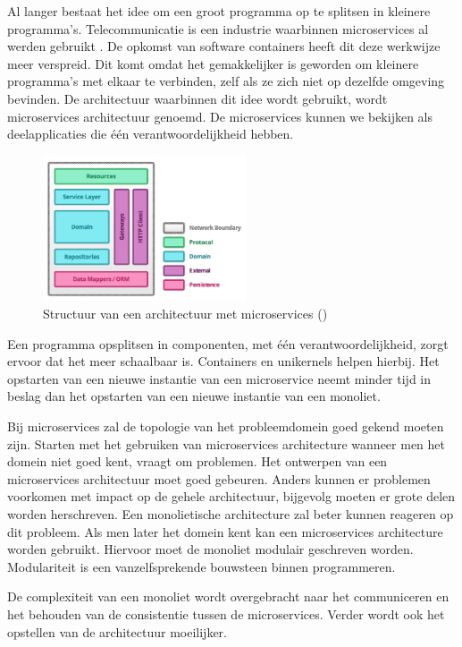 Al langer bestaat het idee om een groot programma op te splitsen in kleinere programma's. Telecommunicatie is een industrie waarbinnen microservices al werden gebruikt \cite{griffin_survey_2007}. De opkomst van software containers heeft dit deze werkwijze meer verspreid. Dit komt omdat het gemakkelijker is geworden om kleinere programma's met elkaar te verbinden, zelf als ze zich niet op dezelfde omgeving bevinden. De architectuur waarbinnen dit idee wordt gebruikt, wordt microservices architectuur genoemd. De microservices kunnen we bekijken als deelapplicaties die één verantwoordelijkheid hebben.

\begin{figure}
    \centering
    \includegraphics[width=6cm]{img/microservice_structure_example}
    \caption{Structuur van een architectuur met microservices (\cite{toby_clemson_testing_2014}) }
    \label{fig:microservice_structure_example}
\end{figure}


Een programma opsplitsen in componenten, met één verantwoordelijkheid, zorgt ervoor dat het meer schaalbaar is. Containers en unikernels helpen hierbij. Het opstarten van een nieuwe instantie van een microservice neemt minder tijd in beslag dan het opstarten van een nieuwe instantie van een monoliet.

Bij microservices zal de topologie van het probleemdomein goed gekend moeten zijn. Starten met het gebruiken van microservices architecture wanneer men het domein niet goed kent, vraagt om problemen. Het ontwerpen van een microservices architectuur moet goed gebeuren. Anders kunnen er problemen voorkomen met impact op de gehele architectuur, bijgevolg moeten er grote delen worden herschreven. Een monolietische architecture zal beter kunnen reageren op dit probleem. Als men later het domein kent kan een microservices architecture worden gebruikt. Hiervoor moet de monoliet modulair geschreven worden. Modulariteit is een vanzelfsprekende bouwsteen binnen programmeren.

De complexiteit van een monoliet wordt overgebracht naar het communiceren en het behouden van de consistentie tussen de microservices. Verder wordt ook het opstellen van de architectuur moeilijker.

